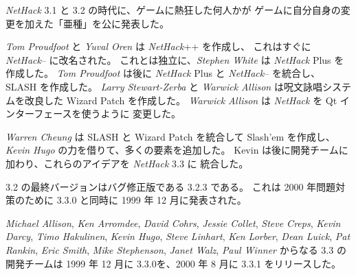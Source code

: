 \medskip
{\it NetHack\/} 3.1 と 3.2 の時代に、ゲームに熱狂した何人かが
ゲームに自分自身の変更を加えた「亜種」を公に発表した。

\medskip
{\it Tom Proudfoot} と {\it Yuval Oren} は {\it NetHack\/}++ を作成し、
これはすぐに {\it NetHack\/}-- に改名された。
これとは独立に、{\it Stephen White} は {\it NetHack\/} Plus を作成した。
{\it Tom Proudfoot} は後に {\it NetHack\/} Plus と {\it NetHack\/}-- を統合し、
SLASH を作成した。
{\it Larry Stewart-Zerba} と {\it Warwick Allison} は呪文詠唱システムを改良した
Wizard Patch を作成した。
{\it Warwick Allison} は {\it NetHack\/} を Qt インターフェースを使うように
変更した。

\medskip
{\it Warren Cheung} は SLASH と Wizard Patch を統合して Slash'em を作成し、
{\it Kevin Hugo} の力を借りて、多くの要素を追加した。
Kevin は後に開発チームに加わり、これらのアイデアを {\it NetHack\/} 3.3 に
統合した。

\medskip
3.2 の最終バージョンはバグ修正版である 3.2.3 である。
これは 2000 年問題対策のために 3.3.0 と同時に 1999 年 12 月に発表された。

\medskip
{\it Michael Allison}, {\it Ken Arromdee}, 
{\it David Cohrs}, {\it Jessie Collet}, {\it Steve Creps}, {\it Kevin Darcy}, 
{\it Timo Hakulinen}, {\it Kevin Hugo}, {\it Steve Linhart}, {\it Ken Lorber}, 
{\it Dean Luick}, {\it Pat Rankin}, {\it Eric Smith}, {\it Mike Stephenson}, 
{\it Janet Walz}, {\it Paul Winner} からなる 3.3 の開発チームは
1999 年 12 月に 3.3.0を、2000 年 8 月に 3.3.1 をリリースした。

